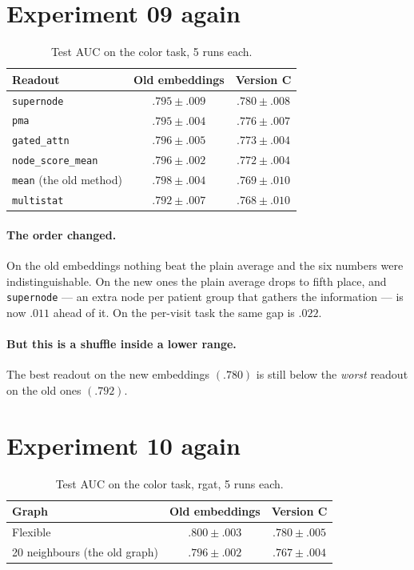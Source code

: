 \documentclass[11pt]{article}
\begin{document}
\section*{Experiment 09 again}

\begin{table}[h]
\centering
\begin{tabularx}{\textwidth}{Xcc}
\toprule
Readout & Old embeddings & Version C \\
\midrule
\texttt{supernode} & $.795 \pm .009$ & $\mathbf{.780 \pm .008}$ \\
\texttt{pma} & $.795 \pm .004$ & $.776 \pm .007$ \\
\texttt{gated\_attn} & $.796 \pm .005$ & $.773 \pm .004$ \\
\texttt{node\_score\_mean} & $.796 \pm .002$ & $.772 \pm .004$ \\
\texttt{mean} (the old method) & $\mathbf{.798 \pm .004}$ & $.769 \pm .010$ \\
\texttt{multistat} & $.792 \pm .007$ & $.768 \pm .010$ \\
\bottomrule
\end{tabularx}
\caption{Test AUC on the color task, 5 runs each.}
\end{table}

\paragraph{The order changed.} On the old embeddings nothing beat the plain average and the
six numbers were indistinguishable. On the new ones the plain average drops to fifth place,
and \texttt{supernode} --- an extra node per patient group that gathers the information --- is
now $.011$ ahead of it. On the per-visit task the same gap is $.022$.

\paragraph{But this is a shuffle inside a lower range.} The best readout on the new embeddings
$(.780)$ is still below the \emph{worst} readout on the old ones $(.792)$.

\section*{Experiment 10 again}

\begin{table}[h]
\centering
\begin{tabularx}{\textwidth}{Xcc}
\toprule
Graph & Old embeddings & Version C \\
\midrule
Flexible & $\mathbf{.800 \pm .003}$ & $\mathbf{.780 \pm .005}$ \\
20 neighbours (the old graph) & $.796 \pm .002$ & $.767 \pm .004$ \\
\bottomrule
\end{tabularx}
\caption{Test AUC on the color task, rgat, 5 runs each.}
\end{table}
\end{document}
